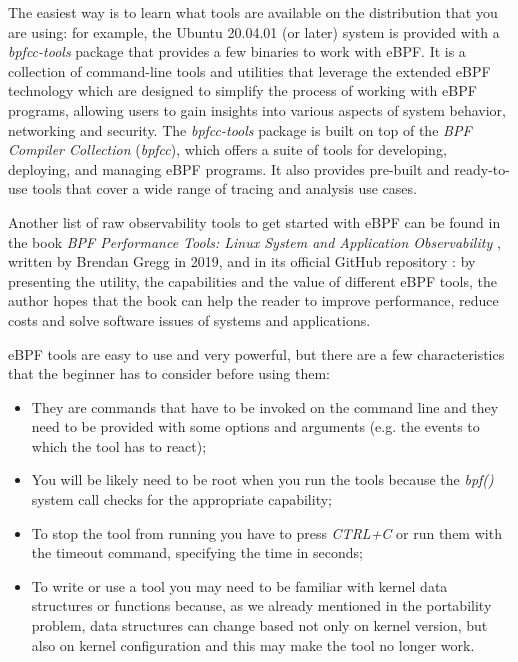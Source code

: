 The easiest way is to learn what tools are available on the distribution that you are using: for example, the Ubuntu 20.04.01 (or later) system is provided with a \textit{bpfcc-tools} package that provides a few binaries to work with eBPF.
It is a collection of command-line tools and utilities that leverage the extended eBPF technology which are designed to simplify the process of working with eBPF programs, allowing users to gain insights into various aspects of system behavior, networking and security.
The \textit{bpfcc-tools} package is built on top of the \textit{BPF Compiler Collection} (\textit{bpfcc}), which offers a suite of tools for developing, deploying, and managing eBPF programs. 
It also provides pre-built and ready-to-use tools that cover a wide range of tracing and analysis use cases. 

Another list of raw observability tools to get started with eBPF can be found in the book \textit{BPF Performance Tools: Linux System and Application Observability} \cite{BPFToolsBookWebsite}, written by Brendan Gregg in 2019, and in its official GitHub repository \cite{BPFToolsBookGitHubRepo}: by presenting the utility, the capabilities and the value of different eBPF tools, the author hopes that the book can help the reader to improve performance, reduce costs and solve software issues of systems and applications.

eBPF tools are easy to use and very powerful, but there are a few characteristics that the beginner has to consider before using them:

\begin{itemize}
	\item They are commands that have to be invoked on the command line and they need 
		to be provided with some options and arguments (e.g. the events to which the tool has to react);
	\item You will be likely need to be root when you run the tools because the
		\textit{bpf()} system call checks for the appropriate capability;
	\item To stop the tool from running you have to press \textit{CTRL+C} or run them 
		with the timeout command, specifying the time in seconds;
	\item To write or use a tool you may need to be familiar with kernel data 
		structures or functions because, as we already mentioned in the portability problem, data structures can change based not only on kernel version, but also on kernel configuration and this may make the tool no longer work.
\end{itemize}

